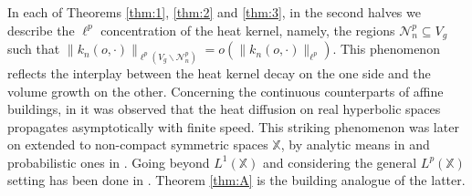 \documentclass[11pt]{amsart}
\newcommand{\scrN}{\mathscr{N}}
\theoremstyle{plain}
\newcounter{thm}
\theoremstyle{definition}
\numberwithin{equation}{section}
\begin{document}
In each of Theorems \ref{thm:1}, \ref{thm:2} and \ref{thm:3}, in the second halves we describe the $\ell^p$ concentration of 
the heat kernel, namely, the regions $\scrN_n^p \subseteq V_g$ such that 
$\|k_n(o, \cdot)\|_{\ell^p(V_g \smallsetminus \scrN_n^p)}=o(\|k_n(o, \cdot)\|_{\ell^{p}})$.
This phenomenon reflects the interplay between the heat kernel decay on the one side and the volume growth on 
the other. Concerning the continuous counterparts of affine buildings, in \cite[Corollary 5.7.3]{Dav1989}
it was observed that the heat diffusion on real hyperbolic spaces propagates asymptotically with finite speed. This striking 
phenomenon was later on extended to non-compact symmetric spaces $\mathbb{X}$, by analytic means in \cite{AnSe1992} and 
probabilistic ones in \cite{B94}. Going beyond $L^1(\mathbb{X})$ and considering the general $L^p(\mathbb{X})$ setting has been
done in \cite{aj}. Theorem \ref{thm:A} is the building analogue of the latter.
\end{document}
